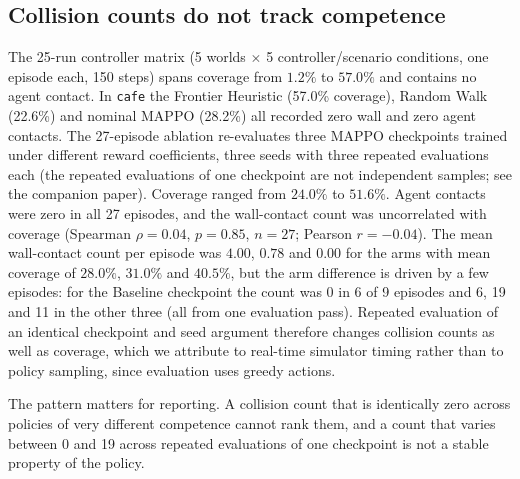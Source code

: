 \documentclass[12pt]{article}
\begin{document}
\subsection{Collision counts do not track competence}
\label{sec:decouple}
The 25-run controller matrix (5 worlds $\times$ 5 controller/scenario
conditions, one episode each, 150 steps) spans coverage from $1.2\%$ to
$57.0\%$ and contains no agent contact. In \texttt{cafe} the Frontier
Heuristic (57.0\% coverage), Random Walk (22.6\%) and nominal MAPPO
(28.2\%) all recorded zero wall and zero agent contacts. The 27-episode
ablation re-evaluates three MAPPO checkpoints trained under different reward
coefficients, three seeds with three repeated evaluations each (the
repeated evaluations of one checkpoint are not independent samples; see the
companion paper). Coverage ranged from $24.0\%$ to $51.6\%$. Agent contacts
were zero in all 27 episodes, and the wall-contact count was uncorrelated
with coverage (Spearman $\rho=0.04$, $p=0.85$, $n=27$; Pearson $r=-0.04$).
The mean wall-contact count per episode was $4.00$, $0.78$ and $0.00$ for
the arms with mean coverage of $28.0\%$, $31.0\%$ and $40.5\%$, but the
arm difference is driven by a few episodes: for the Baseline checkpoint
the count was 0 in 6 of 9 episodes and 6, 19 and 11 in the other three
(all from one evaluation pass). Repeated evaluation of an identical
checkpoint and seed argument therefore changes collision counts as well as
coverage, which we attribute to real-time simulator timing rather than to
policy sampling, since evaluation uses greedy actions.

The pattern matters for reporting. A collision count that is identically
zero across policies of very different competence cannot rank them, and a
count that varies between 0 and 19 across repeated evaluations of one
checkpoint is not a stable property of the policy.
\end{document}
